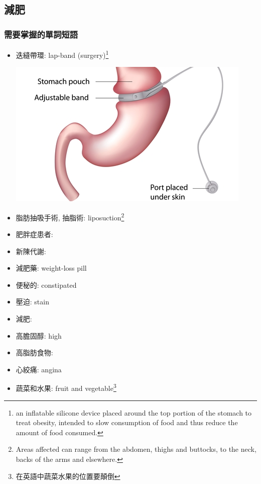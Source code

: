 \subsection{減肥}
\subsubsection*{需要掌握的單詞短語}
\begin{multicols}{2}
\begin{itemize}
  \itemsep0em
  \item 迭縫帶環: lap-band (surgery)\footnote{an inflatable silicone device placed around the top portion of the stomach to treat obesity, intended to slow consumption of food and thus reduce the amount of food consumed.}
  \begin{center}
  	\includegraphics[scale=1.8]{pics/lap-band}
  \end{center}
  \item 脂肪抽吸手術, 抽脂術: liposuction\footnote{Areas affected can range from the abdomen, thighs and buttocks, to the neck, backs of the arms and elsewhere.}
  \item 肥胖症患者: 
  \item 新陳代謝: 
  \item 減肥藥: weight-loss pill
  \item 便秘的: constipated
  \item 壓迫: stain
  \item 減肥: 
  \item 高膽固醇: high 
  \item 高脂肪食物: 
  \item 心絞痛: angina
  \item 蔬菜和水果: fruit and vegetable\footnote{在英語中蔬菜水果的位置要顛倒}
\end{itemize}
\end{multicols}

